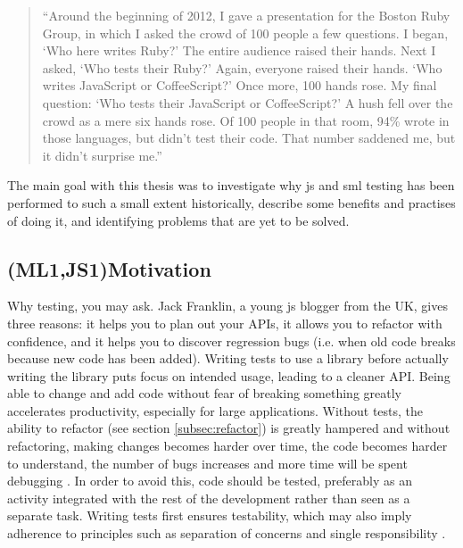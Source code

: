 \documentclass[11pt]{article}
\begin{document}
\begin{quote}
``Around the beginning of 2012, I gave a presentation for the Boston Ruby Group, in which I asked the crowd of 100 people a few questions. I began, `Who here writes Ruby?' The entire audience raised their hands. Next I asked, `Who tests their Ruby?' Again, everyone raised their hands. `Who writes JavaScript or CoffeeScript?' Once more, 100 hands rose. My final question: `Who tests their JavaScript or CoffeeScript?' A hush fell over the crowd as a mere six hands rose. Of 100 people in that room, 94\% wrote in those languages, but didn't test their code. That number saddened me, but it didn't surprise me.''
\end{quote}

\begin{center}
\end{center}

The main goal with this thesis was to investigate why \gls{js} and \gls{sml} testing has been performed to such a small extent historically, describe some benefits and practises of doing it, and identifying problems that are yet to be solved.

\subsection{(ML1,JS1)Motivation}
\label{subsec:motivation}

Why testing, you may ask. Jack Franklin, a young \gls{js} blogger from the UK, gives three reasons: it helps you to plan out your APIs, it allows you to refactor with confidence, and it helps you to discover regression bugs (i.e. when old code breaks because new code has been added). Writing tests to use a library before actually writing the library puts focus on intended usage, leading to a cleaner API. Being able to change and add code without fear of breaking something greatly accelerates productivity, especially for large applications. \cite{JackFranklin} Without tests, the ability to refactor (see section \ref{subsec:refactor}) is greatly hampered and without refactoring, making changes becomes harder over time, the code becomes harder to understand, the number of bugs increases and more time will be spent debugging \cite[p.~47-49]{Refactoring}. In order to avoid this, code should be tested, preferably as an activity integrated with the rest of the development rather than seen as a separate task. Writing tests first ensures testability, which may also imply adherence to principles such as separation of concerns and single responsibility \cite[p.~35-37]{Clean}.
\end{document}
